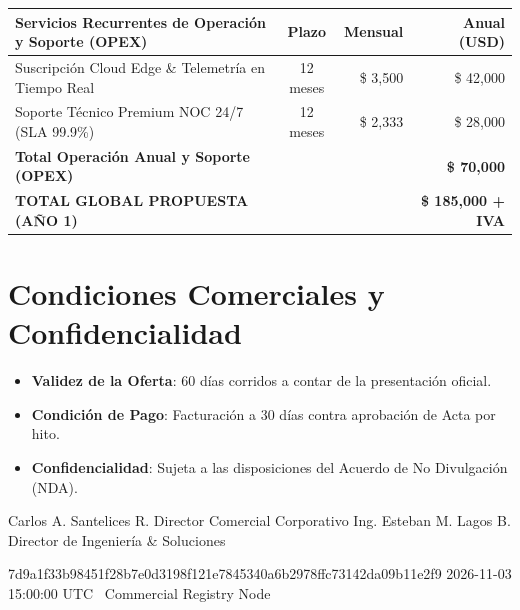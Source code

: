 \documentclass[11pt,letterpaper]{article}
\begin{document}
\vspace{0.4em}

\begin{tabularx}{\linewidth}{@{}X c r r@{}}
  \toprule
  \textbf{\color{corpPrimary}Servicios Recurrentes de Operaci\'on y Soporte (OPEX)} & \textbf{\color{corpPrimary}Plazo} & \textbf{\color{corpPrimary}Mensual} & \textbf{\color{corpPrimary}Anual (USD)} \\
  \midrule
  Suscripci\'on Cloud Edge \& Telemetr\'ia en Tiempo Real & 12 meses & \$ 3,500 & \$ 42,000 \\
  Soporte T\'ecnico Premium NOC 24/7 (SLA 99.9\%) & 12 meses & \$ 2,333 & \$ 28,000 \\
  \midrule
  \textbf{Total Operaci\'on Anual y Soporte (OPEX)} & & & \textbf{\$ 70,000} \\
  \midrule
  \textbf{\color{corpPrimary}TOTAL GLOBAL PROPUESTA (A\~NO 1)} & & & \textbf{\$ 185,000 + IVA} \\
  \bottomrule
\end{tabularx}

\vspace{0.3em}


\vspace{0.1em}

\section{Condiciones Comerciales y Confidencialidad}

\begin{itemize}[leftmargin=1.5em, itemsep=1pt, topsep=1pt]
  \item \textbf{Validez de la Oferta}: 60 d\'ias corridos a contar de la presentaci\'on oficial.
  \item \textbf{Condici\'on de Pago}: Facturaci\'on a 30 d\'ias contra aprobaci\'on de Acta por hito.
  \item \textbf{Confidencialidad}: Sujeta a las disposiciones del Acuerdo de No Divulgaci\'on (NDA).
\end{itemize}

\dualcontrolsignature
  {Carlos A. Santelices R.}
  {Director Comercial Corporativo}
  {\corporatebrandlegal}
  {Ing. Esteban M. Lagos B.}
  {Director de Ingenier\'ia \& Soluciones}
  {\corporatebrandlegal}

\vspace{0.4em}

\cryptoseal
  {7d9a1f33b98451f28b7e0d3198f121e7845340a6b2978ffc73142da09b11e2f9}
  {2026-11-03 15:00:00 UTC}
  {\corporatebrandname\ Commercial Registry Node}
\end{document}
